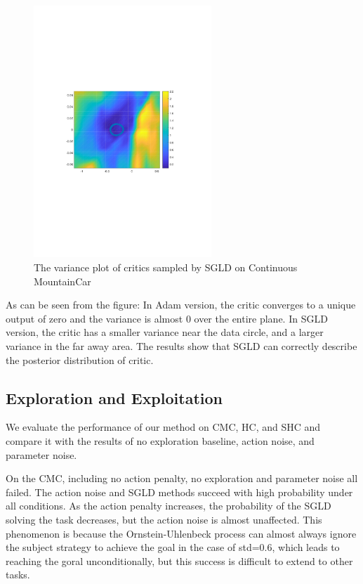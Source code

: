 \begin{figure}[htb]
   \begin{center}   
   \centerline{\includegraphics[width=190pt,trim=100 280 100 280,clip]{figs/mc_sgld_state.pdf}}
   \caption{The variance plot of critics sampled by SGLD on Continuous MountainCar}
   \label{fig:stateaction}   
   \end{center}
\end{figure}
As can be seen from the figure: In Adam version, the critic converges to a unique output of zero and the variance is almost 0 over the entire plane. In SGLD version, the critic has a smaller variance near the data circle, and a larger variance in the far away area. The results show that SGLD can correctly describe the posterior distribution of critic.

\subsection{Exploration and Exploitation}
We evaluate the performance of our method on CMC, HC, and SHC and compare it with the results of no exploration baseline, action noise, and parameter noise.

On the CMC, including no action penalty, no exploration and parameter noise all failed. The action noise and SGLD methods succeed with high probability under all conditions. As the action penalty increases, the probability of the SGLD solving the task decreases, but the action noise is almost unaffected. This phenomenon is because the Ornstein-Uhlenbeck process can almost always ignore the subject strategy to achieve the goal in the case of std=0.6, which leads to reaching the goral unconditionally, but this success is difficult to extend to other tasks.

